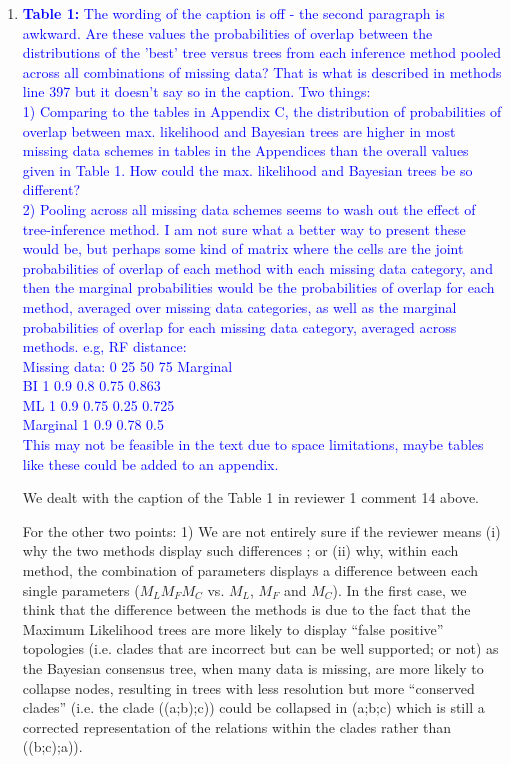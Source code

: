 \documentclass[12pt,letterpaper]{article}
\begin{document}
\begin{enumerate}
\item{\textcolor{blue}{\textbf{Table 1:} The wording of the caption is off - the second paragraph is awkward. 
Are these values the probabilities of overlap between the distributions of the 'best' tree versus trees from each inference method pooled across all combinations of missing data? That is what is described in methods line 397 but it doesn't say so in the caption.
Two things:\\
1)  Comparing to the tables in Appendix C, the distribution of probabilities of overlap between max. likelihood and Bayesian trees are higher in most missing data schemes in tables in the Appendices than the overall values given in Table 1. How could the max. likelihood and Bayesian trees be so different?\\
2)  Pooling across all missing data schemes seems to wash out the effect of tree-inference method. I am not sure what a better way to present these would be, but perhaps some kind of matrix where the cells are the joint probabilities of overlap of each method with each missing data category, and then the marginal probabilities would be the probabilities of overlap for each method, averaged over missing data categories, as well as the marginal probabilities of overlap for each missing data category, averaged across methods.  e.g, RF distance:\\
Missing data:   0   25  50      75      Marginal \\
BI              1   0.9 0.8     0.75    0.863 \\
ML              1   0.9 0.75    0.25    0.725 \\
Marginal        1   0.9 0.78    0.5     \\
This may not be feasible in the text due to space limitations, maybe tables like these could be added to an appendix.}}

We dealt with the caption of the Table 1 in reviewer 1 comment 14 above.

For the other two points:
1) We are not entirely sure if the reviewer means (i) why the two methods display such differences ; or (ii) why, within each method, the combination of parameters displays a difference between each single parameters ($M_LM_FM_C$ vs. $M_L$, $M_F$ and $M_C$).
In the first case, we think that the difference between the methods is due to the fact that the Maximum Likelihood trees are more likely to display ``false positive'' topologies (i.e. clades that are incorrect but can be well supported; or not) as the Bayesian consensus tree, when many data is missing, are more likely to collapse nodes, resulting in trees with less resolution but more ``conserved clades'' (i.e. the clade ((a;b);c)) could be collapsed in (a;b;c) which is still a corrected representation of the relations within the clades rather than ((b;c);a)).


\end{enumerate}
\end{document}
